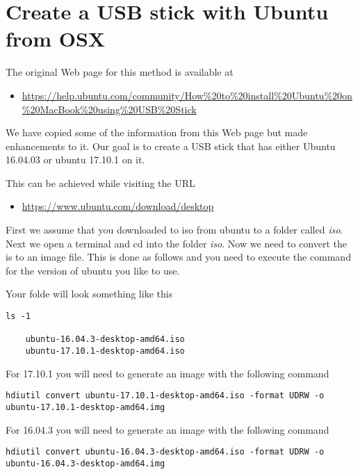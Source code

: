 \hypertarget{create-a-usb-stick-with-ubuntu-from-osx}{%
\section{Create a USB stick with Ubuntu from
OSX}\label{create-a-usb-stick-with-ubuntu-from-osx}}

The original Web page for this method is available at

\begin{itemize}
\tightlist
\item
  \url{https://help.ubuntu.com/community/How\%20to\%20install\%20Ubuntu\%20on\%20MacBook\%20using\%20USB\%20Stick}
\end{itemize}

We have copied some of the information from this Web page but made
enhancements to it. Our goal is to create a USB stick that has either
Ubuntu 16.04.03 or ubuntu 17.10.1 on it.

This can be achieved while visiting the URL

\begin{itemize}
\tightlist
\item
  \url{https://www.ubuntu.com/download/desktop}
\end{itemize}

First we assume that you downloaded to iso from ubuntu to a folder
called \emph{iso}. Next we open a terminal and cd into the folder
\emph{iso}. Now we need to convert the is to an image file. This is done
as follows and you need to execute the command for the version of ubuntu
you like to use.

Your folde will look something like this

\begin{verbatim}
ls -1

    ubuntu-16.04.3-desktop-amd64.iso
    ubuntu-17.10.1-desktop-amd64.iso
\end{verbatim}

For 17.10.1 you will need to generate an image with the following
command

\begin{verbatim}
hdiutil convert ubuntu-17.10.1-desktop-amd64.iso -format UDRW -o ubuntu-17.10.1-desktop-amd64.img
\end{verbatim}

For 16.04.3 you will need to generate an image with the following
command

\begin{verbatim}
hdiutil convert ubuntu-16.04.3-desktop-amd64.iso -format UDRW -o ubuntu-16.04.3-desktop-amd64.img
\end{verbatim}

